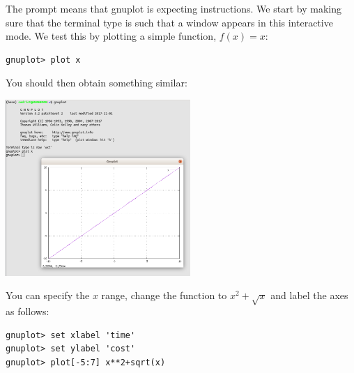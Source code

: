 The prompt means that gnuplot is expecting instructions. We start by making sure that 
the terminal type is such that a window appears in this interactive mode. We test this 
by plotting a simple function, $f(x)=x$:

\begin{mdframed}[backgroundcolor=gray!10]
\begin{verbatim}
gnuplot> plot x
\end{verbatim}
\end{mdframed}


You should then obtain something similar:

\begin{center}
\includegraphics[width=7cm]{images/gnuplot/gnuplot1}
\end{center}

You can specify the $x$ range, change the function to $x^2+\sqrt{x}$ and label the axes as follows:

\begin{mdframed}[backgroundcolor=gray!10]
\begin{verbatim}
gnuplot> set xlabel 'time'
gnuplot> set ylabel 'cost'
gnuplot> plot[-5:7] x**2+sqrt(x)
\end{verbatim}
\end{mdframed}

